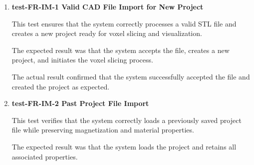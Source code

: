 \documentclass[12pt, titlepage]{article}
\begin{document}
\begin{enumerate}

\item \textbf{test-FR-IM-1 Valid CAD File Import for New Project}

\hspace{1.5em} This test ensures that the system correctly processes a valid STL file and creates a new project ready for voxel slicing and visualization.

The expected result was that the system accepts the file, creates a new project, and initiates the voxel slicing process.

The actual result confirmed that the system successfully accepted the file and created the project as expected.


\item \textbf{test-FR-IM-2 Past Project File Import}

\hspace{1.5em} This test verifies that the system correctly loads a previously saved project file while preserving magnetization and material properties.

The expected result was that the system loads the project and retains all associated properties.


\end{enumerate}
\end{document}
